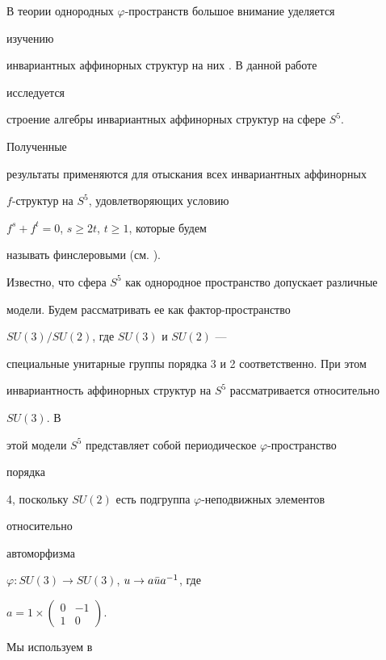  




 


В теории однородных $\varphi$-пространств большое внимание уделяется 


изучению 


инвариантных аффинорных структур на них \cite{Bal}. В данной работе 


исследуется 


строение алгебры инвариантных аффинорных структур на сфере $S^5$. 


Полученные 


результаты применяются для отыскания всех инвариантных аффинорных 


$f$-структур на $S^5$, удовлетворяющих условию 


$f^s+f^t=0$, $s\ge 2t$, $t\ge 1$, которые будем 


называть финслеровыми (см. \cite{Tam}). 


 


Известно, что сфера $S^5$ как однородное пространство допускает различные 


модели. Будем рассматривать ее как фактор-пространство 


$SU(3)/SU(2)$, где $SU(3)$ и $SU(2)$ --- 


специальные унитарные группы порядка 3 и 2 соответственно. При этом 


инвариантность аффинорных структур на $S^5$ рассматривается относительно 


$SU(3)$. В 


этой модели $S^5$ представляет собой периодическое $\varphi$-пространство 


порядка 


4, поскольку $SU(2)$ есть подгруппа $\varphi$-неподвижных элементов 


относительно 


автоморфизма 


$\varphi:SU(3)\to SU(3)$, $u\to a\Bar u a^{-1}$, где 


$a=1\times


\begin{pmatrix}


0&-1\\ 1&0 


\end{pmatrix}


$. 


Мы используем в 


